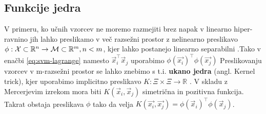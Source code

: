 \subsection{Funkcije jedra}
V primeru, ko učnih vzorcev ne moremo razmejiti brez napak v linearno hiper-ravnino jih lahko preslikamo v več razsežni prostor z nelinearno preslikavo $\phi: \mathcal{X} \subset \mathbb{R}^n \to \mathcal{M} \subset \mathbb{R}^m, n < m$, kjer lahko postanejo linearno separabilni \cite{chapelle1999support,boughorbel2005generalized}.Tako v enačbi \eqref{eq:svm-lagrange} namesto $\vec{x}_i^\top\vec{x}_j$ uporabimo $\phi(\vec{x_i})^\top\phi(\vec{x_j})$ Preslikovanju vzorcev v m-razsežni prostor se lahko znebimo s t.i. \textbf{ukano jedra} (angl. Kernel trick), kjer uporabimo implicitno preslikavo $K: \mathcal{\Xi} \times \mathcal{\Xi} \to \mathbb{R}$ \cite{boughorbel2005generalized}. V skladu z Mercerjevim izrekom mora biti $K(\vec{x}_i,\vec{x}_j)$ simetrična in pozitivna funkcija. Takrat obstaja preslikava $\phi$ tako da velja $K(\vec{x_i}, \vec{x_j}) = \phi(\vec{x}_i)^\top\phi(\vec{x}_j)$.


